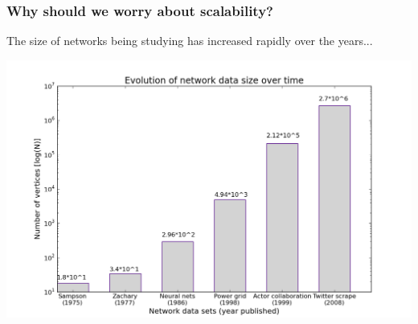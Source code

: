 \documentclass[xcolor=dvipsnames, 9pt]{beamer}
\begin{document}
\begin{frame}[fragile]
    \frametitle{Why should we worry about scalability?}
    The size of networks being studying has increased rapidly over the years...
    \begin{center}
        \includegraphics[scale=.35]{../images/figures/net_size_evo.png}
    \end{center}
\end{frame}
\end{document}
